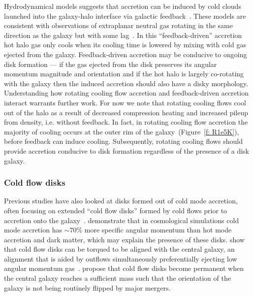 \documentclass[fleqn,usenatbib]{mnras}
\begin{document}
Hydrodynamical models suggests that accretion can be induced by cold clouds launched into the galaxy-halo interface via galactic feedback~\citep[e.g.][]{Marinacci2010, Marinacci2011, Marinacci2012, Armillotta2016a, Fraternali2017, Hobbs2020}.
These models are consistent with observations of extraplanar neutral gas rotating in the same direction as the galaxy but with some lag~\citep[e.g.][]{Fraternali2008,  Marasco2012}.
In this ``feedback-driven'' accretion hot halo gas only cools when its cooling time is lowered by mixing with cold gas ejected from the galaxy.
Feedback-driven accretion may be conducive to ongoing disk formation --- if the gas ejected from the disk preserves its angular momentum magnitude and orientation and if the hot halo is largely co-rotating with the galaxy then the induced accretion should also have a disky morphology.
Understanding how rotating cooling flow accretion and feedback-driven accretion interact warrants further work.
For now we note that rotating cooling flows cool out of the halo as a result of decreased compression heating and increased pileup from density, i.e. without feedback.
In fact, in rotating cooling flow accretion the majority of cooling occurs at the outer rim of the galaxy~(Figure~\ref{f: R1e5K}), before feedback can induce cooling.
Subsequently, rotating cooling flows should provide accretion conducive to disk formation regardless of the presence of a disk galaxy.

\subsubsection{Cold flow disks}
\label{s: other disk formation -- cold flow disks}

Previous studies have also looked at disks formed out of cold mode accretion, often focusing on extended ``cold flow disks'' formed by cold flows prior to accretion onto the galaxy~\citep[e.g.][]{Stewart2011a}.
\cite{Stewart2013} demonstrate that in cosmological simulations cold mode accretion has $\sim 70\%$ more specific angular momentum than hot mode accretion and dark matter, which may explain the presence of these disks.
\cite{Danovich2015} show that cold flow disks can be torqued to be aligned with the central galaxy, an alignment that is aided by outflows simultaneously preferentially ejecting low angular momentum gas~\citep[e.g.][]{Ubler2014}.
\cite{Dekel2020a} propose that cold flow disks become permanent when the central galaxy reaches a sufficient mass such that the orientation of the galaxy is not being routinely flipped by major mergers.
\end{document}
